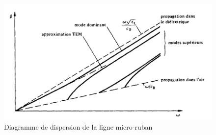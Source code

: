 \documentclass[french]{article}
\begin{document}
\begin{figure}[H]
	\centering
	\includegraphics[scale=0.3]{../2carac/caract_large_bande/approx_QTEM.png}
	\caption{Diagramme de dispersion de la ligne micro-ruban}
	\label{fig:diagramme_dispersion}
\end{figure}

\newpage
\end{document}
